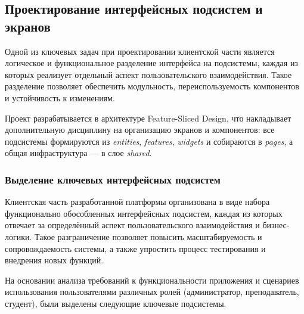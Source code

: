\subsection{Проектирование интерфейсных подсистем и экранов}

Одной из ключевых задач при проектировании клиентской части является логическое и функциональное разделение интерфейса на подсистемы, каждая из которых реализует отдельный аспект пользовательского взаимодействия. Такое разделение позволяет обеспечить модульность, переиспользуемость компонентов и устойчивость к изменениям.

Проект разрабатывается в архитектуре Feature-Sliced Design, что накладывает дополнительную дисциплину на организацию экранов и компонентов: все подсистемы формируются из \textit{entities}, \textit{features}, \textit{widgets} и собираются в \textit{pages}, а общая инфраструктура — в слое \textit{shared}.

\subsubsection{Выделение ключевых интерфейсных подсистем}

Клиентская часть разработанной платформы организована в виде набора функционально обособленных интерфейсных подсистем, каждая из которых отвечает за определённый аспект пользовательского взаимодействия и бизнес-логики. Такое разграничение позволяет повысить масштабируемость и сопровождаемость системы, а также упростить процесс тестирования и внедрения новых функций.

На основании анализа требований к функциональности приложения и сценариев использования пользователями различных ролей (администратор, преподаватель, студент), были выделены следующие ключевые подсистемы.

